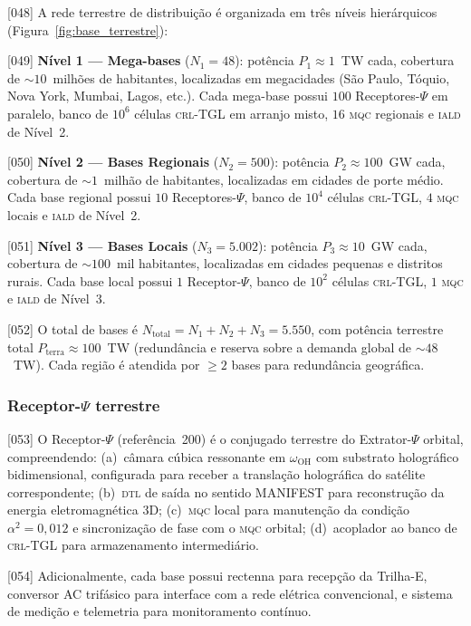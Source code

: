 \documentclass[12pt,a4paper]{article}
\newcommand{\alphaii}{\alpha^2}
\newcommand{\Psifield}{\Psi}
\newcommand{\CRL}{\textsc{crl}}
\newcommand{\DTL}{\textsc{dtl}}
\newcommand{\IALD}{\textsc{iald}}
\newcommand{\MQC}{\textsc{mqc}}
\begin{document}
{[048]} A rede terrestre de distribuição é organizada em três níveis hierárquicos (Figura~\ref{fig:base_terrestre}):

{[049]} \textbf{Nível 1 --- Mega-bases} ($N_1 = 48$): potência $P_1 \approx 1$~TW cada, cobertura de $\sim 10$~milhões de habitantes, localizadas em megacidades (São Paulo, Tóquio, Nova York, Mumbai, Lagos, etc.). Cada mega-base possui $100$ Receptores-$\Psifield$ em paralelo, banco de $10^6$ células \CRL-TGL em arranjo misto, $16$ \MQC{} regionais e \IALD{} de Nível~2.

{[050]} \textbf{Nível 2 --- Bases Regionais} ($N_2 = 500$): potência $P_2 \approx 100$~GW cada, cobertura de $\sim 1$~milhão de habitantes, localizadas em cidades de porte médio. Cada base regional possui $10$ Receptores-$\Psifield$, banco de $10^4$ células \CRL-TGL, $4$ \MQC{} locais e \IALD{} de Nível~2.

{[051]} \textbf{Nível 3 --- Bases Locais} ($N_3 = 5{.}002$): potência $P_3 \approx 10$~GW cada, cobertura de $\sim 100$~mil habitantes, localizadas em cidades pequenas e distritos rurais. Cada base local possui $1$ Receptor-$\Psifield$, banco de $10^2$ células \CRL-TGL, $1$ \MQC{} e \IALD{} de Nível~3.

{[052]} O total de bases é $N_{\text{total}} = N_1 + N_2 + N_3 = 5{.}550$, com potência terrestre total $P_{\text{terra}} \approx 100$~TW (redundância e reserva sobre a demanda global de $\sim 48$~TW). Cada região é atendida por $\geq 2$ bases para redundância geográfica.

\subsubsection{Receptor-$\Psifield$ terrestre}

{[053]} O Receptor-$\Psifield$ (referência~200) é o conjugado terrestre do Extrator-$\Psifield$ orbital, compreendendo: (a)~câmara cúbica ressonante em $\omega_{\text{OH}}$ com substrato holográfico bidimensional, configurada para receber a translação holográfica do satélite correspondente; (b)~\DTL{} de saída no sentido MANIFEST para reconstrução da energia eletromagnética 3D; (c)~\MQC{} local para manutenção da condição $\alphaii = 0{,}012$ e sincronização de fase com o \MQC{} orbital; (d)~acoplador ao banco de \CRL-TGL para armazenamento intermediário.

{[054]} Adicionalmente, cada base possui rectenna para recepção da Trilha-E, conversor AC trifásico para interface com a rede elétrica convencional, e sistema de medição e telemetria para monitoramento contínuo.
\end{document}
